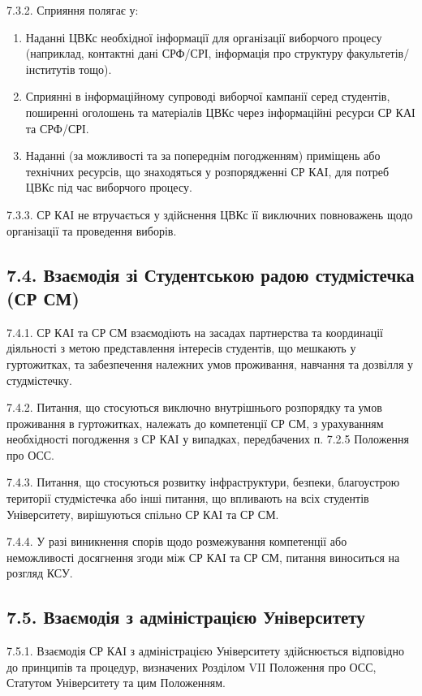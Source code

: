     7.3.2. Сприяння полягає у:

        \begin{enumerate}[label=\alph*)]
            \item Наданні ЦВКс необхідної інформації для організації виборчого процесу (наприклад, контактні дані СРФ/СРІ, інформація про структуру факультетів/інститутів тощо).
            \item Сприянні в інформаційному супроводі виборчої кампанії серед студентів, поширенні оголошень та матеріалів ЦВКс через інформаційні ресурси СР КАІ та СРФ/СРІ.
            \item Наданні (за можливості та за попереднім погодженням) приміщень або технічних ресурсів, що знаходяться у розпорядженні СР КАІ, для потреб ЦВКс під час виборчого процесу.
        \end{enumerate}

    7.3.3. СР КАІ не втручається у здійснення ЦВКс її виключних повноважень щодо організації та проведення виборів.

\subsection*{7.4. Взаємодія зі Студентською радою студмістечка (СР СМ)}
    7.4.1. СР КАІ та СР СМ взаємодіють на засадах партнерства та координації діяльності з метою представлення інтересів студентів, що мешкають у гуртожитках, та забезпечення належних умов проживання, навчання та дозвілля у студмістечку.

    7.4.2. Питання, що стосуються виключно внутрішнього розпорядку та умов проживання в гуртожитках, належать до компетенції СР СМ, з урахуванням необхідності погодження з СР КАІ у випадках, передбачених п. 7.2.5 Положення про ОСС.

    7.4.3. Питання, що стосуються розвитку інфраструктури, безпеки, благоустрою території студмістечка або інші питання, що впливають на всіх студентів Університету, вирішуються спільно СР КАІ та СР СМ.

    7.4.4. У разі виникнення спорів щодо розмежування компетенції або неможливості досягнення згоди між СР КАІ та СР СМ, питання виноситься на розгляд КСУ.

\subsection*{7.5. Взаємодія з адміністрацією Університету}
    7.5.1. Взаємодія СР КАІ з адміністрацією Університету здійснюється відповідно до принципів та процедур, визначених Розділом VII Положення про ОСС, Статутом Університету та цим Положенням.


